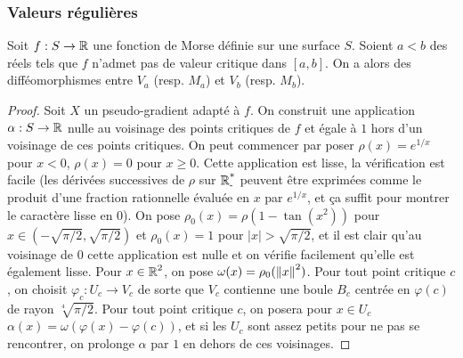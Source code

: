 \subsubsection{Valeurs régulières}

\begin{thm}
    Soit $f:S\to\operatorname{\mathbb R}$ une fonction de Morse définie sur une surface $S$.
    Soient $a<b$ des réels tels que $f$ n'admet pas de valeur critique dans $[a,b]$.
    On a alors des difféomorphismes entre $V_a$ (resp. $M_a$) et $V_b$ (resp. $M_b$).
\end{thm}

\begin{proof}
    Soit $X$ un pseudo-gradient adapté à $f$. 
    On construit une application $\alpha:S\to\operatorname{\mathbb R}$ nulle au voisinage des points critiques 
    de $f$ et  égale à $1$ hors d'un voisinage de ces points critiques.
    On peut commencer par poser $\rho(x)=e^{1/x}$ pour $x<0$, $\rho(x)=0$ pour $x\geq 0$. 
    Cette application est lisse, la vérification est facile (les dérivées successives de 
    $\rho$ sur $\operatorname{\mathbb R_-^*}$ peuvent être exprimées comme le produit d'une fraction rationnelle 
    évaluée en $x$ par $e^{1/x}$, et ça suffit pour montrer le caractère lisse en $0$).
    On pose $\rho_0(x)=\rho(1-\tan(x^2))$ pour $x\in(-\sqrt{\pi/2},\sqrt{\pi/2})$ et 
    $\rho_0(x)=1$ pour $|x|>\sqrt{\pi/2}$, et il est clair qu'au voisinage de $0$ cette 
    application est nulle et on vérifie facilement qu'elle est également lisse. 
    Pour $x\in\operatorname{\mathbb R}^2$, on pose $\omega(x)=\rho_0(\left\lVert x\right\rVert^2)$.
    Pour tout point critique $c$, on choisit $\varphi_c:U_c\to V_c$ de sorte que $V_c$ 
    contienne une boule $B_c$ centrée en $\varphi(c)$ de rayon $\sqrt[4]{\pi/2}$.
    Pour tout point critique $c$, on posera pour $x\in U_c$ 
    $\alpha(x)=\omega(\varphi(x)-\varphi(c))$, et si les $U_c$ sont assez petits pour
    ne pas se rencontrer, on prolonge $\alpha$ par $1$ en dehors de ces voisinages.


\end{proof}
